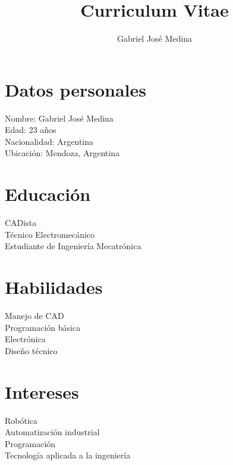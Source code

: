 \documentclass{article}
\begin{document}
\title{Curriculum Vitae}
\author{Gabriel José Medina}
\date{}

\maketitle

\section{Datos personales}

Nombre: Gabriel José Medina\\
Edad: 23 años\\
Nacionalidad: Argentina\\
Ubicación: Mendoza, Argentina\\

\section{Educación}

CADista\\
Técnico Electromecánico\\
Estudiante de Ingeniería Mecatrónica\\

\section{Habilidades}

Manejo de CAD\\
Programación básica\\
Electrónica\\
Diseño técnico\\

\section{Intereses}

Robótica\\
Automatización industrial\\
Programación\\
Tecnología aplicada a la ingeniería
\end{document}
